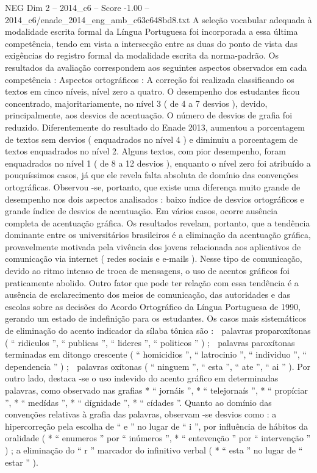 \begin{textsample}{NEG Dim 2 – 2014\_c6 – Score -1.00 – 2014\_c6/enade\_2014\_eng\_amb\_c63c648bd8.txt}
A seleção vocabular adequada à modalidade escrita formal da Língua Portuguesa foi incorporada a essa última competência, tendo em vista a intersecção entre as duas do ponto de vista das exigências do registro formal da modalidade escrita da norma-padrão.
Os resultados da avaliação correspondem aos seguintes aspectos observados em cada competência : Aspectos ortográficos : A correção foi realizada classificando os textos em cinco níveis, nível zero a quatro.
O desempenho dos estudantes ficou concentrado, majoritariamente, no nível 3 ( de 4 a 7 desvios ), devido, principalmente, aos desvios de acentuação.
O número de desvios de grafia foi reduzido.
Diferentemente do resultado do Enade 2013, aumentou a porcentagem de textos sem desvios ( enquadrados no nível 4 ) e diminuiu a porcentagem de textos enquadrados no nível 2.
Alguns textos, com pior desempenho, foram enquadrados no nível 1 ( de 8 a 12 desvios ), enquanto o nível zero foi atribuído a pouquíssimos casos, já que ele revela falta absoluta de domínio das convenções ortográficas.
Observou -se, portanto, que existe uma diferença muito grande de desempenho nos dois aspectos analisados : baixo índice de desvios ortográficos e grande índice de desvios de acentuação.
Em vários casos, ocorre ausência completa de acentuação gráfica.
Os resultados revelam, portanto, que a tendência dominante entre os universitários brasileiros é a eliminação da acentuação gráfica, provavelmente motivada pela vivência dos jovens relacionada aos aplicativos de comunicação via internet ( redes sociais e e-mails ).
Nesse tipo de comunicação, devido ao ritmo intenso de troca de mensagens, o uso de acentos gráficos foi praticamente abolido.
Outro fator que pode ter relação com essa tendência é a ausência de esclarecimento dos meios de comunicação, das autoridades e das escolas sobre as decisões do Acordo Ortográfico da Língua Portuguesa de 1990, gerando um estado de indefinição para os estudantes.
Os casos mais sistemáticos de eliminação do acento indicador da sílaba tônica são :  palavras proparoxítonas ( “ ridiculos ”, “ publicas ”, “ lideres ”, “ politicos ” ) ;  palavras paroxítonas terminadas em ditongo crescente ( “ homicidios ”, “ latrocinio ”, “ individuo ”, “ dependencia ” ) ;  palavras oxítonas ( “ ninguem ”, “ esta ”, “ ate ”, “ ai ” ).
Por outro lado, destaca -se o uso indevido do acento gráfico em determinadas palavras, como observado nas grafias * “ jornáis ”, * “ telejornaís ”, * “ propíciar ”, * “ medídas ”, * “ dígnidade ”, * “ cídades ”.
Quanto ao domínio das convenções relativas à grafia das palavras, observam -se desvios como : a hipercorreção pela escolha de “ e ” no lugar de “ i ”, por influência de hábitos da oralidade ( * “ enumeros ” por “ inúmeros ”, * “ entevenção ” por “ intervenção ” ) ; a eliminação do “ r ” marcador do infinitivo verbal ( * “ esta ” no lugar de “ estar ” ).

\end{textsample}

